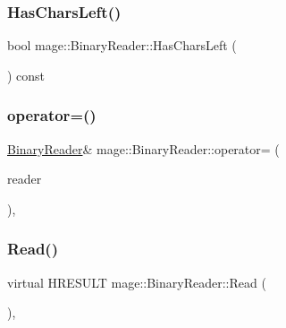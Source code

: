 \hypertarget{classmage_1_1_binary_reader_a35b10713dca7a416b73b28d5f6aaf600}{}\label{classmage_1_1_binary_reader_a35b10713dca7a416b73b28d5f6aaf600} 
\subsubsection{\texorpdfstring{Has\+Chars\+Left()}{HasCharsLeft()}}
{\footnotesize\ttfamily bool mage\+::\+Binary\+Reader\+::\+Has\+Chars\+Left (\begin{DoxyParamCaption}{ }\end{DoxyParamCaption}) const\hspace{0.3cm}{\ttfamily [protected]}}

\hypertarget{classmage_1_1_binary_reader_a0408bb456983b4a03ae42ab69c6f4bc3}{}\label{classmage_1_1_binary_reader_a0408bb456983b4a03ae42ab69c6f4bc3} 
\subsubsection{\texorpdfstring{operator=()}{operator=()}}
{\footnotesize\ttfamily \hyperlink{classmage_1_1_binary_reader}{Binary\+Reader}\& mage\+::\+Binary\+Reader\+::operator= (\begin{DoxyParamCaption}\item[{const \hyperlink{classmage_1_1_binary_reader}{Binary\+Reader} \&}]{reader }\end{DoxyParamCaption})\hspace{0.3cm}{\ttfamily [private]}, {\ttfamily [delete]}}

\hypertarget{classmage_1_1_binary_reader_a000cf97b640a5fbd1d5c33ccaae7fb39}{}\label{classmage_1_1_binary_reader_a000cf97b640a5fbd1d5c33ccaae7fb39} 
\subsubsection{\texorpdfstring{Read()}{Read()}}
{\footnotesize\ttfamily virtual H\+R\+E\+S\+U\+LT mage\+::\+Binary\+Reader\+::\+Read (\begin{DoxyParamCaption}{ }\end{DoxyParamCaption})\hspace{0.3cm}{\ttfamily [protected]}, {}}

